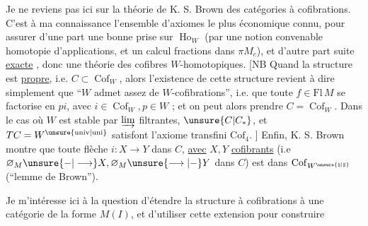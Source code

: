 Je ne reviens pas ici sur la théorie de K. S. Brown
des catégories à cofibrations. C'est à ma connaissance
l'ensemble d'axiomes le plus économique
connu, pour assurer d'une part une bonne
prise sur $\operatorname{Ho}_W$ (par une notion convenable
homotopie d'applications, et un calcul 
fractions dans $\pi M_c$), et d'autre part
 suite \uline{exacte} , donc une
théorie des cofibres $W$-homotopiques. [NB
Quand la structure est \uline{propre}, i.e. $C\subset\operatorname{Cof}_W$,
alors l'existence de cette structure revient
à dire simplement que ``$W$ admet assez de
$W$-cofibrations'', i.e. que toute $f\in\mathrm{Fl}\,M$
se factorise en $pi$, avec $i\in\operatorname{Cof}_W,p\in W$ ;
et on peut alors prendre $C=\operatorname{Cof}_W$. Dans le
cas où $W$ est stable par  $\varinjlim$ filtrantes,
$\unsure{C|C_*}$, et $TC=W^{\unsure{\mathrm{univ}|\mathrm{uni}}}$ satisfont  l'axiome transfini
$\mathrm{Cof}_4$. ] Enfin, K. S. Brown montre
que toute flèche $i\colon X\longrightarrow Y$ dans $C$,
\uline{avec} $X,Y$ \uline{cofibrants} (i.e $\varnothing_M\unsure{-|\longrightarrow}X,\varnothing_M\unsure{\longrightarrow|-}Y$
dans $C$) est dans $\operatorname{Cof}_{W^{\unsure{\natural|\sharp}}}$ (``lemme de
Brown'').

Je m'intéresse ici à la question
d'étendre la structure à cofibrations
à une catégorie de la forme $M(I)$,
et d'utiliser cette extension pour construire

